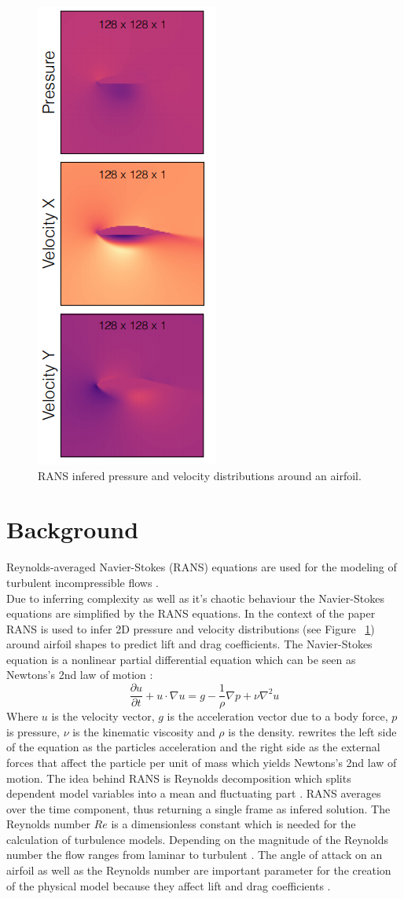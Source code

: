 \documentclass[acmtog]{techreportacmart}
\begin{document}
\begin{figure}[h]
  \includegraphics[width=.2\textwidth, height=.2\textheight]{figures/sampleTarget}
  \caption{RANS infered pressure and velocity distributions around an airfoil.}
  \label{fig:zero}
\end{figure}

\section{Background}
Reynolds-averaged Navier-Stokes (RANS) equations are used for the modeling of turbulent incompressible flows \cite{Alfonsi}. \\
Due to inferring complexity as well as it's chaotic behaviour the Navier-Stokes equations are simplified by the RANS equations.
In the context of the paper RANS is used to infer 2D pressure and velocity distributions (see Figure ~\ref{fig:zero}) around airfoil shapes to predict
lift and drag coefficients.
The Navier-Stokes equation is a nonlinear partial differential equation which can be seen as Newtons's 2nd law of motion \cite{BISTAFA2018}:
\begin{equation}
\label{eqn:01}
\frac{\partial{u}}{\partial{t}} + u \cdot \nabla u = g - \frac{1}{\rho} \nabla p + \nu \nabla^{2}u
\end{equation}
Where $u$ is the velocity vector, $g$ is the acceleration vector due to a body force, $p$ is pressure, 
$\nu$ is the kinematic viscosity and $\rho$ is the density. \cite{BISTAFA2018} rewrites the left side 
of the equation as the particles acceleration and the right side as the external forces that affect 
the particle per unit of mass which yields Newtons's 2nd law of motion.
The idea behind RANS is Reynolds decomposition which splits dependent model variables into a mean and fluctuating part \cite{Alfonsi}.
RANS averages over the time component, thus returning a single frame as infered solution.
The Reynolds number $Re$ is a dimensionless constant which is needed for the calculation of turbulence 
models. Depending on the magnitude of the Reynolds number the flow ranges from laminar to turbulent 
\cite{lissaman1983}. The angle of attack on an airfoil as well as the Reynolds number are important 
parameter for the creation of the physical model because they affect lift and drag coefficients \cite{lissaman1983}. 
\end{document}
